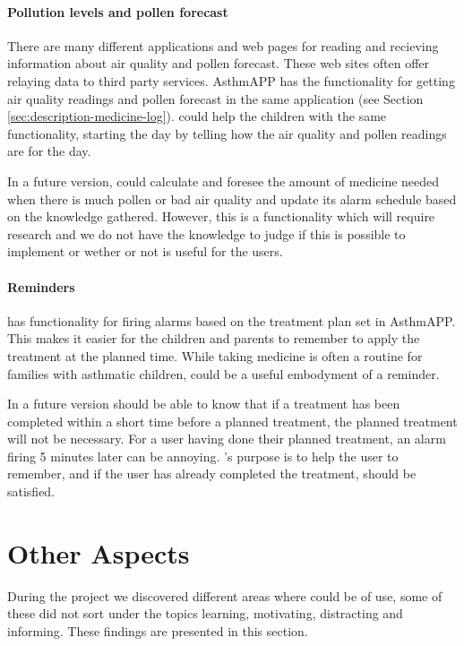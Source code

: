 \paragraph{Pollution levels and pollen forecast}
There are many different applications and web pages for reading and recieving information about air quality and pollen forecast. These web sites often offer relaying data to third party services. AsthmAPP has the functionality for getting air quality readings and pollen forecast in the same application (see Section \ref{sec:description-medicine-log}).
\buddy{} could help the children with the same functionality, starting the day by telling how the air quality and pollen readings are for the day. 

In a future version, \buddy{} could calculate and foresee the amount of medicine needed when there is much pollen or bad air quality and update its alarm schedule based on the knowledge gathered. However, this is a functionality which will require research and we do not have the knowledge to judge if this is possible to implement or wether or not is useful for the users. 


\paragraph{Reminders}
\buddy{} has functionality for firing alarms based on the treatment plan set in AsthmAPP. This makes it easier for the children and parents to remember to apply the treatment at the planned time. While taking medicine is often a routine for families with asthmatic children, \buddy{} could be a useful embodyment of a reminder. 

In a future version \buddy{} should be able to know that if a treatment has been completed within a short time before a planned treatment, the planned treatment will not be necessary. For a user having done their planned treatment, an alarm firing 5 minutes later can be annoying. \buddy{}'s purpose is to help the user to remember, and if the user has already completed the treatment, \ab{} should be satisfied. 

\section{Other Aspects}
\label{sec:otheraspects}
During the project we discovered different areas where \ab{} could be of use, some of these did not sort under the topics learning, motivating, distracting and informing. These findings are presented in this section.

